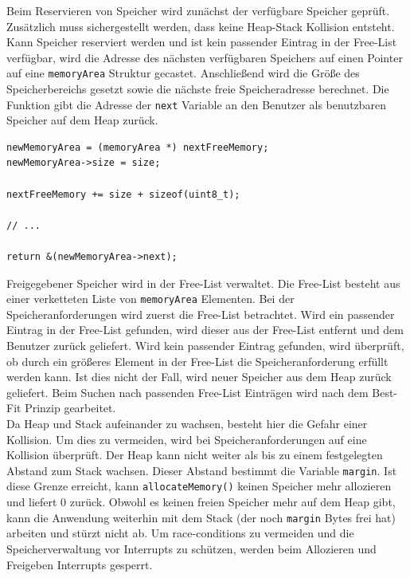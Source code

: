 \documentclass[fontsize=12pt, toc=bibliography, notitlepage]{scrreprt}
\begin{document}
Beim Reservieren von Speicher wird zunächst der verfügbare Speicher geprüft. Zusätzlich muss sichergestellt werden, dass keine Heap-Stack Kollision entsteht. Kann Speicher reserviert werden und ist kein passender Eintrag in der Free-List verfügbar, wird die Adresse des nächsten verfügbaren Speichers auf einen Pointer auf eine \lstinline$memoryArea$ Struktur gecastet. Anschließend wird die Größe des Speicherbereichs gesetzt sowie die nächste freie Speicheradresse berechnet. Die Funktion gibt die Adresse der \lstinline$next$ Variable an den Benutzer als benutzbaren Speicher auf dem Heap zurück.

\begin{lstlisting}[title=memory.c]
newMemoryArea = (memoryArea *) nextFreeMemory;
newMemoryArea->size = size;

nextFreeMemory += size + sizeof(uint8_t);

// ...

return &(newMemoryArea->next);
\end{lstlisting}

Freigegebener Speicher wird in der Free-List verwaltet. Die Free-List besteht aus einer verketteten Liste von \lstinline$memoryArea$ Elementen. Bei der Speicheranforderungen wird zuerst die Free-List betrachtet. Wird ein passender Eintrag in der Free-List gefunden, wird dieser aus der Free-List entfernt und dem Benutzer zurück geliefert. Wird kein passender Eintrag gefunden, wird überprüft, ob durch ein größeres Element in der Free-List die Speicheranforderung erfüllt werden kann. Ist dies nicht der Fall, wird neuer Speicher aus dem Heap zurück geliefert. Beim Suchen nach passenden Free-List Einträgen wird nach dem Best-Fit Prinzip gearbeitet.\\

Da Heap und Stack aufeinander zu wachsen, besteht hier die Gefahr einer Kollision. Um dies zu vermeiden, wird bei Speicheranforderungen auf eine Kollision überprüft. Der Heap kann nicht weiter als bis zu einem festgelegten Abstand zum Stack wachsen. Dieser Abstand bestimmt die Variable \lstinline$margin$. Ist diese Grenze erreicht, kann \lstinline$allocateMemory()$ keinen Speicher mehr allozieren und liefert 0 zurück. Obwohl es keinen freien Speicher mehr auf dem Heap gibt, kann die Anwendung weiterhin mit dem Stack (der noch \lstinline$margin$ Bytes frei hat) arbeiten und stürzt nicht ab. Um race-conditions zu vermeiden und die Speicherverwaltung vor Interrupts zu schützen, werden beim Allozieren und Freigeben Interrupts gesperrt.
\end{document}
